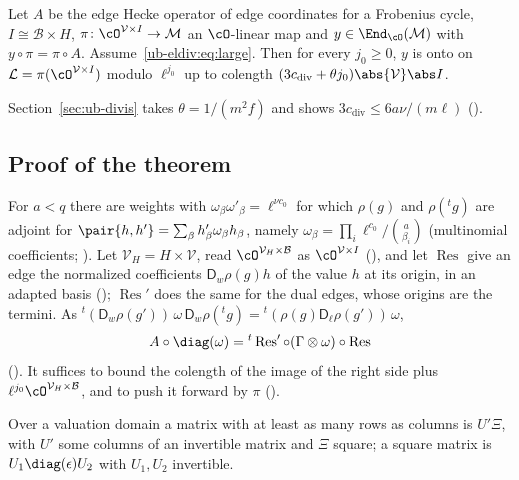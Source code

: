 \begin{theorem}\label{ub-eldiv:thm:main}
Let $A$ be the edge Hecke operator of edge coordinates for a Frobenius cycle, $I\cong\mathcal
B\times H$, $\pi\colon\cO^{\mathcal V\times I}\to\mathcal M$ an $\cO$-linear map and
$y\in\End_\cO(\mathcal M)$ with $y\circ\pi=\pi\circ A$. Assume~\eqref{ub-eldiv:eq:large}. Then for
every $j_0\ge0$, $y$ is onto on $\mathcal L=\pi(\cO^{\mathcal V\times I})$ modulo $\ell^{j_0}$ up to
colength $(3c_{\mathrm{div}}+\theta j_0)\abs{\mathcal V}\abs I$.
\end{theorem}

Section~\ref{sec:ub-divis} takes $\theta=1/(m^2f)$ and shows
$3c_{\mathrm{div}}\le6a\nu/(m\ell)$ ().

\subsection{Proof of the theorem}\label{ub-eldiv:sec:proof}

For $a<q$ there are weights with $\omega_\beta\omega'_\beta=\ell^{\nu c_0}$ for which $\rho(g)$ and
$\rho({}^tg)$ are adjoint for $\pair{h,h'}=\sum_\beta h'_\beta\omega_\beta h_\beta$, namely
$\omega_\beta=\prod_i\ell^{c_0}/\binom a{\beta_i}$ (multinomial coefficients;
). Let $\mathcal V_H=H\times\mathcal V$, read
$\cO^{\mathcal V_H\times\mathcal B}$ as $\cO^{\mathcal V\times I}$ (), and let
$\operatorname{Res}$ give an edge the normalized coefficients $\mathsf D_w\rho(g)h$ of the value $h$ at its
origin, in an adapted basis (); $\operatorname{Res}'$ does
the same for the dual edges, whose origins are the termini. As ${}^t(\mathsf D_w\rho(g'))\,\omega\,
\mathsf D_w\rho({}^tg)={}^t(\rho(g)\mathsf D_\ell\rho(g'))\,\omega$,
\begin{equation}\label{ub-eldiv:eq:factor}
  A\circ\diag(\omega)={}^t\operatorname{Res}'\circ(\Gamma\otimes\omega)\circ\operatorname{Res}
\end{equation}
(). It suffices to bound the
colength of the image of the right side plus $\ell^{j_0}\cO^{\mathcal V_H\times\mathcal B}$, and to push it
forward by $\pi$ ().

\begin{fact}\label{ub-eldiv:fact:smith}
Over a valuation domain a matrix with at least as many rows as columns is $U'\Xi$, with $U'$ some
columns of an invertible matrix and $\Xi$ square; a square matrix is $U_1\diag(\epsilon)U_2$ with
$U_1,U_2$ invertible.
\end{fact}

